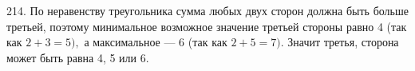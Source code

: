 214. По неравенству треугольника сумма любых двух сторон должна быть больше третьей, поэтому минимальное возможное значение третьей стороны равно 4 (так как $2+3=5),$ а максимальное --- 6 (так как $2+5=7).$ Значит третья, сторона может быть равна 4, 5 или 6.\\
